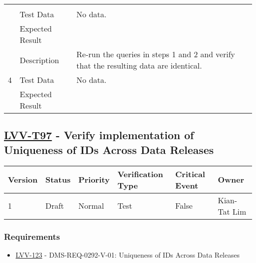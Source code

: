 \begin{longtable}[]{p{1.3cm}p{2cm}p{13cm}}
\begin{minipage}[t]{13cm}
{            \vspace{\dp0}
            } \end{minipage} \\ \cline{2-3}
            & Test Data &
            \begin{minipage}[t]{13cm}{\footnotesize
                No data.
                \vspace{\dp0}
            } \end{minipage} \\ \cline{2-3}
            & Expected Result &
        \\ \midrule

            \multirow{3}{*}{ 4 } & Description &
            \begin{minipage}[t]{13cm}{\footnotesize
            Re-run the queries in steps 1 and 2 and verify that the resulting data
are identical.

            \vspace{\dp0}
            } \end{minipage} \\ \cline{2-3}
            & Test Data &
            \begin{minipage}[t]{13cm}{\footnotesize
                No data.
                \vspace{\dp0}
            } \end{minipage} \\ \cline{2-3}
            & Expected Result &
        \\ \midrule
    \end{longtable}

\subsection{\href{https://jira.lsstcorp.org/secure/Tests.jspa\#/testCase/LVV-T97}{LVV-T97}
    - Verify implementation of Uniqueness of IDs Across Data Releases}\label{lvv-t97}

\begin{longtable}[]{llllll}
\toprule
Version & Status & Priority & Verification Type & Critical Event & Owner
\\\midrule
1 & Draft & Normal &
Test & False & Kian-Tat Lim
\\\bottomrule
\end{longtable}

\subsubsection{Requirements}
\begin{itemize}
\item \href{https://jira.lsstcorp.org/browse/LVV-123}{LVV-123} - DMS-REQ-0292-V-01: Uniqueness of IDs Across Data Releases
\end{itemize}

